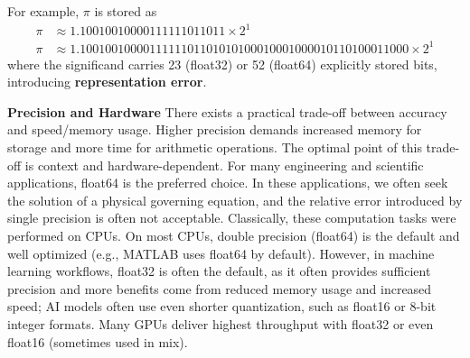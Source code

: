 
For example, $\pi$ is stored as
\begin{align*}
  \pi &\approx 1.10010010000111111011011 \times 2^{1} \tag{float32} \\
  \pi &\approx 1.1001001000011111101101010100010001000010110100011000 \times 2^{1} \tag{float64}
\end{align*}
where the significand carries 23 (float32) or 52 (float64) explicitly stored bits, introducing \textbf{representation error}.

\textbf{Precision and Hardware}\quad
There exists a practical trade-off between accuracy and speed/memory usage.
Higher precision demands increased memory for storage and more time for arithmetic operations.
The optimal point of this trade-off is context and hardware-dependent.
For many engineering and scientific applications, float64 is the preferred choice.
In these applications, we often seek the solution of a physical governing equation, and the relative error introduced by single precision is often not acceptable.
Classically, these computation tasks were performed on CPUs.
On most CPUs, double precision (float64) is the default and well optimized (e.g., MATLAB uses float64 by default).
However, in machine learning workflows, float32 is often the default, as it often provides sufficient precision and more benefits come from reduced memory usage and increased speed; AI models often use even shorter quantization, such as float16 or 8-bit integer formats.
Many GPUs deliver highest throughput with float32 or even float16 (sometimes used in mix).


